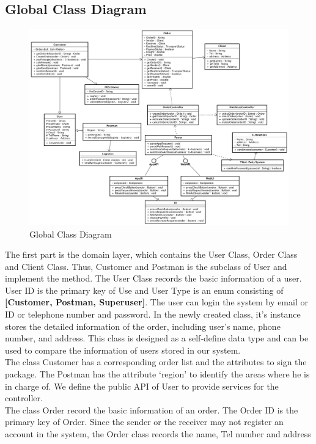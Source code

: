 \documentclass[12pt]{scrreprt}
\begin{document}
\subsection{Global Class Diagram}
\begin{figure}[H]
  \centering\includegraphics[width=6in]{DocumentRes/ClassDiagram.png}
  \caption{Global Class Diagram}
\end{figure}
The first part is the domain layer, which contains the User Class, Order Class
and Client Class. Thus, Customer and Postman is the subclass of User and
implement the method. The User Class records the basic information of a user.
User ID is the primary key of Use and User Type is an enum consisting of
\textbf{[Customer, Postman, Superuser]}. The user can login the system by email
or ID or telephone number and password. In the newly created class, it's
instance stores the detailed information of the order, including user's name,
phone number, and address. This class is designed as a self-define data type
and can be used to compare the information of users stored in our system.\\
The class Customer has a corresponding order list and the attributes to sign
the package. The Postman has the attribute ‘region’ to identify the areas where
he is in charge of. We define the public API of User to provide services for
the controller.\\
The class Order record the basic information of an order. The Order ID is the
primary key of Order. Since the sender or the receiver may not register an
account in the system, the Order class records the name, Tel number and address
\end{document}
